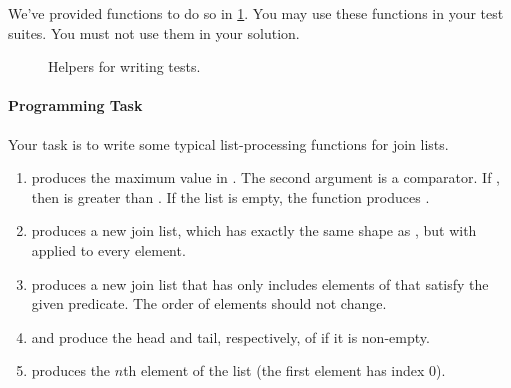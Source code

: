 We've provided functions to do so in \cref{joinlist_tests}.
You may use these functions in your test suites. You must not use them in your
solution.

\begin{figure}
\caption{Helpers for writing tests.}
\label{joinlist_tests}
\end{figure}

\paragraph{Programming Task}

Your task is to write some typical list-processing functions for join lists.

\begin{enumerate}

\item {} produces the maximum value in
  . The second argument is a comparator. If
  , then  is greater than
  . If the list is empty, the function produces
   .

\item {} produces a new join list, which has exactly the same
 shape as , but with  applied to every element.

\item {} produces a new join list that has only
  includes elements of  that satisfy the given predicate.
  The order of elements should not change.

\item {} and  produce the head and tail,
  respectively, of  if it is non-empty.

\item {} produces the $n$th element of the list (the first
  element has index 0).

\end{enumerate}


